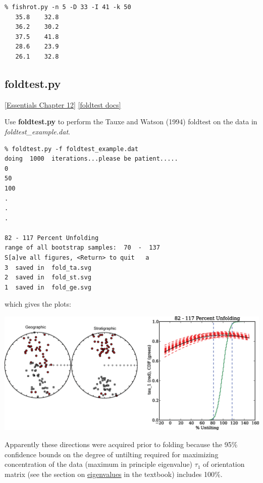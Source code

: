\documentclass[11pt]{book}
\begin{document}
{{\begin{verbatim}
% fishrot.py -n 5 -D 33 -I 41 -k 50
   35.8    32.8
   36.2    30.2
   37.5    41.8
   28.6    23.9
   26.1    32.8
   \end{verbatim}

 \subsection{foldtest.py}
 \href{http://earthref.org/MAGIC/books/Tauxe/Essentials/WebBook3ch12.html#ch12}{[Essentials Chapter 12]}
 \href{https://github.com/PmagPy/PmagPy/blob/master/programs/foldtest.py}{[foldtest docs]}

 Use {\bf foldtest.py} to perform the Tauxe and Watson (1994) \nocite{tauxe94}  foldtest on the data in {\it foldtest\_example.dat}.

 \begin{verbatim}
% foldtest.py -f foldtest_example.dat
doing  1000  iterations...please be patient.....
0
50
100
.
.
.

82 - 117 Percent Unfolding
range of all bootstrap samples:  70  -  137
S[a]ve all figures, <Return> to quit   a
3  saved in  fold_ta.svg
2  saved in  fold_st.svg
1  saved in  fold_ge.svg
 \end{verbatim}

\noindent  which gives the plots:

 {%
   \includegraphics[width=15cm]{EPSfiles/foldtest-ex.eps}}

 Apparently these directions were acquired prior to folding because the 95\% confidence bounds on the degree of untilting required for maximizing concentration of the data (maximum in principle eigenvalue) $\tau_1$ of orientation matrix (see the section on  \href{http://earthref.org/MAGIC/books/Tauxe/Essentials/WebBook3ap1.html#orientation_tensor}{eigenvalues} in the textbook) includes 100\%.
%
%
}}
\end{document}
